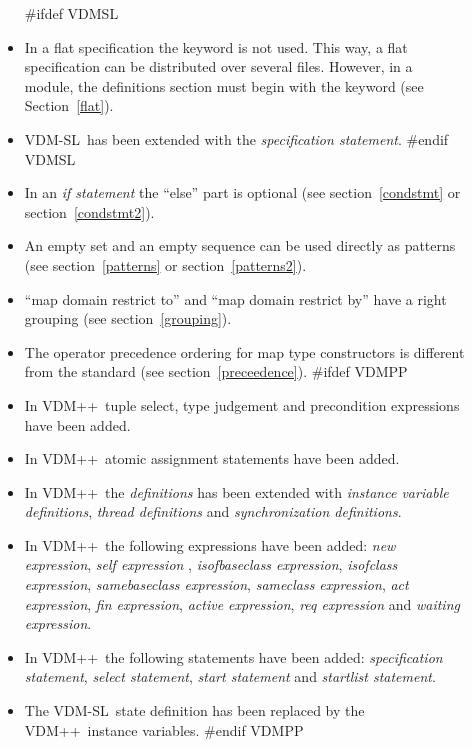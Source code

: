 \documentclass[\pformat,12pt]{article}
\newcommand{\vdmsl}{VDM-SL}
\newcommand{\vdmpp}{VDM++}
\begin{document}
\begin{description}
\begin{itemize}
#ifdef VDMSL
  \item In a flat specification the keyword  is not used.
    This way, a flat specification can be distributed over several files.
    However, in a module, the definitions section must begin with the
    keyword  (see Section~\ref{flat}).

  \item  \vdmsl\ has been extended with the {\em specification statement}.
#endif VDMSL

  \item In an {\it if statement\/} the ``else'' part is optional (see
        section~\ref{condstmt} or section~\ref{condstmt2}).
        
  \item An empty set and an empty sequence can be used directly as
        patterns (see section~\ref{patterns} or section~\ref{patterns2}).
  \item ``map domain restrict to'' and ``map domain restrict by'' have
        a right grouping (see section~\ref{grouping}).
  \item The operator precedence ordering for map type constructors is
        different from the standard (see section~\ref{preceedence}).
#ifdef VDMPP
  \item In  \vdmpp\ tuple select, type judgement and
        precondition expressions have been added.
  \item In  \vdmpp\ atomic assignment statements have been added. 
  \item In  \vdmpp\ the {\em definitions} has been extended with
    {\em instance variable definitions}, 
   {\em thread definitions} and {\em synchronization
    definitions}.

  \item In  \vdmpp\ the following expressions have been added:
    {\em new expression}, {\em self expression }, {\em isofbaseclass
    expression}, {\em 
    isofclass expression}, {\em samebaseclass expression}, {\em
    sameclass expression}, {\em act expression}, {\em fin expression},
    {\em active expression}, {\em req expression} and {\em waiting
    expression}.

  \item In  \vdmpp\ the following statements have been added: {\em
    specification statement}, {\em select statement}, {\em start
    statement} and {\em startlist statement}. %

  \item The \vdmsl\ state definition has been replaced by the \vdmpp\
    instance variables.
#endif VDMPP



\end{itemize}
\end{description}
\end{document}
